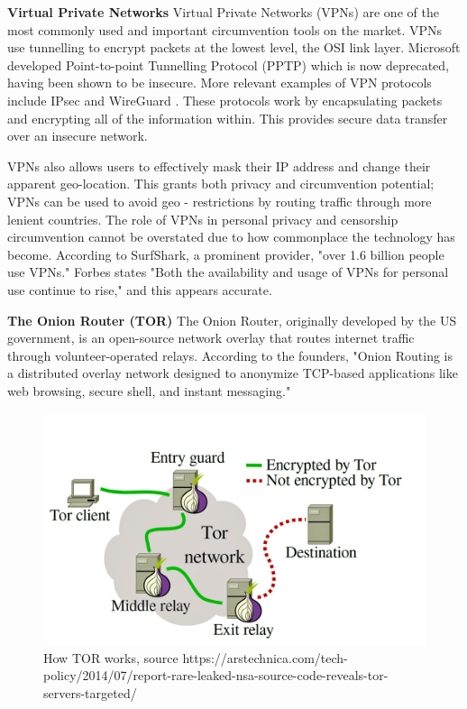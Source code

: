 \textbf{Virtual Private Networks}
Virtual Private Networks (VPNs) are one of the most commonly used and important circumvention tools on the market. VPNs use tunnelling to encrypt packets at the lowest level, the OSI link layer. Microsoft developed Point-to-point Tunnelling Protocol (PPTP) which is now deprecated, having been shown to be insecure. \cite{microsoft_ptpt} More relevant examples of VPN protocols include IPsec \cite{rfc6071} and WireGuard \cite{wireguard_docs}. These protocols work by encapsulating packets and encrypting all of the information within. This provides secure data transfer over an insecure network. \cite{vpn_secure_connection2020} 

VPNs also allows users to effectively mask their IP address and change their apparent geo-location. This grants both privacy and circumvention potential; VPNs can be used to avoid geo - restrictions by routing traffic through more lenient countries. The role of VPNs in personal privacy and censorship circumvention cannot be overstated due to how commonplace the technology has become. According to SurfShark, a prominent provider, "over 1.6 billion people use VPNs." \cite{surfshark_vpn_users} Forbes states "Both the availability and usage of VPNs for personal use continue to rise," and this appears accurate. \cite{forbes_vpn_stats}

\textbf{The Onion Router (TOR)}
The Onion Router, originally developed by the US government, is an open-source network overlay that routes internet traffic through volunteer-operated relays. According to the founders, "Onion Routing is a distributed overlay network designed to anonymize TCP-based applications like web browsing, secure shell, and instant messaging." \cite{dingledine2004tor}

\begin{figure}
    \centering
    \includegraphics[width=1\linewidth]{HowTorWorks.png}
    \caption{How TOR works, source https://arstechnica.com/tech-policy/2014/07/report-rare-leaked-nsa-source-code-reveals-tor-servers-targeted/}
    \label{fig:enter-label}
\end{figure}

